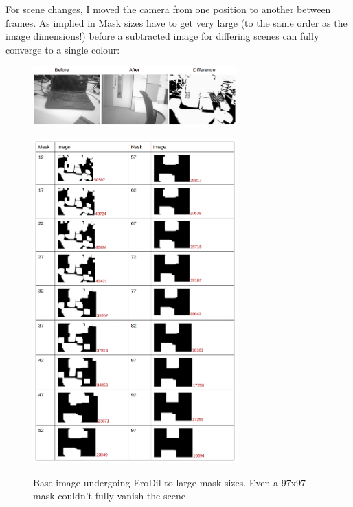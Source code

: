 \documentclass[11pt]{article} %
\begin{document}
For scene changes, I moved the camera from one position to another between frames. As implied in Mask sizes have to get very large (to the same order as the image dimensions!) before a subtracted image for differing scenes can  fully converge to a single colour:

\begin{figure}[H]
        \vspace{-20pt}
        \begin{center}
                \includegraphics[width=0.7\textwidth]{../images/ImageOps/Diff1}
                \label{img:diff1}
        \end{center}
        \vspace{-20pt}
        \begin{center}
                \includegraphics[width=0.7\textwidth]{../images/ImageOps/Diff2}
                \label{img:diff2}
        \end{center}
        \vspace{-20pt}
        \caption{Base image undergoing EroDil to large mask sizes. Even a 97x97 mask couldn’t fully vanish the scene}
	\vspace{-40pt}
\end{figure}
\end{document}
